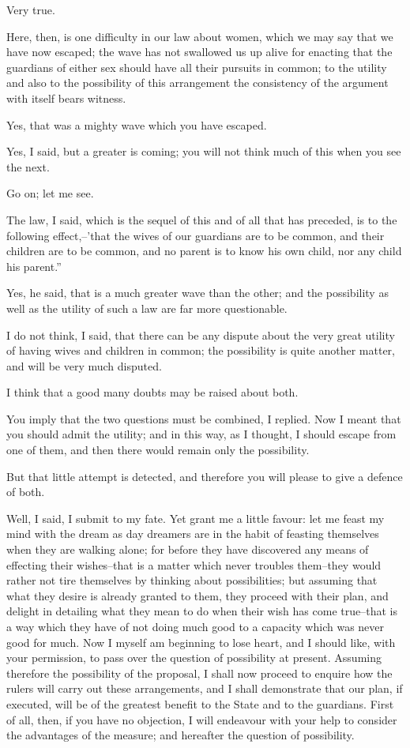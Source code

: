Very true.

Here, then, is one difficulty in our law about women, which we may say
that we have now escaped; the wave has not swallowed us up alive for
enacting that the guardians of either sex should have all their
pursuits in common; to the utility and also to the possibility of this
arrangement the consistency of the argument with itself bears witness.

Yes, that was a mighty wave which you have escaped.

Yes, I said, but a greater is coming; you will not think much of this
when you see the next.

Go on; let me see.

The law, I said, which is the sequel of this and of all that has
preceded, is to the following effect,--'that the wives of our guardians
are to be common, and their children are to be common, and no parent is
to know his own child, nor any child his parent.''

Yes, he said, that is a much greater wave than the other; and
the possibility as well as the utility of such a law are far more
questionable.

I do not think, I said, that there can be any dispute about the very
great utility of having wives and children in common; the possibility is
quite another matter, and will be very much disputed.

I think that a good many doubts may be raised about both.

You imply that the two questions must be combined, I replied. Now I
meant that you should admit the utility; and in this way, as I thought,
I should escape from one of them, and then there would remain only the
possibility.

But that little attempt is detected, and therefore you will please to
give a defence of both.

Well, I said, I submit to my fate. Yet grant me a little favour: let
me feast my mind with the dream as day dreamers are in the habit of
feasting themselves when they are walking alone; for before they have
discovered any means of effecting their wishes--that is a matter which
never troubles them--they would rather not tire themselves by thinking
about possibilities; but assuming that what they desire is already
granted to them, they proceed with their plan, and delight in detailing
what they mean to do when their wish has come true--that is a way which
they have of not doing much good to a capacity which was never good for
much. Now I myself am beginning to lose heart, and I should like, with
your permission, to pass over the question of possibility at present.
Assuming therefore the possibility of the proposal, I shall now proceed
to enquire how the rulers will carry out these arrangements, and I shall
demonstrate that our plan, if executed, will be of the greatest benefit
to the State and to the guardians. First of all, then, if you have no
objection, I will endeavour with your help to consider the advantages of
the measure; and hereafter the question of possibility.

